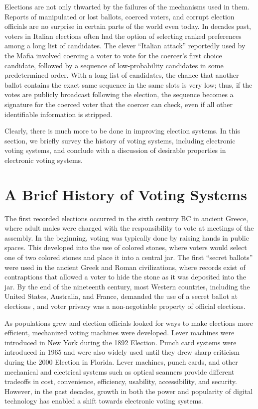 Elections are not only thwarted by the failures of the mechanisms used in them. Reports of manipulated or lost ballots, coerced voters, and corrupt election officials are no surprise in certain parts of the world even today. In decades past, voters in Italian elections often had the option of selecting ranked preferences among a long list of candidates. The clever ``Italian attack'' \cite{naish:italian-attack} reportedly used by the Mafia involved coercing a voter to vote for the coercer's first choice candidate, followed by a sequence of low-probability candidates in some predetermined order. With a long list of candidates, the chance that another ballot contains the exact same sequence in the same slots is very low; thus, if the votes are publicly broadcast following the election, the sequence becomes a signature for the coerced voter that the coercer can check, even if all other identifiable information is stripped.

Clearly, there is much more to be done in improving election systems. In this section, we briefly survey the history of voting systems, including electronic voting systems, and conclude with a discussion of desirable properties in electronic voting systems.

\section{A Brief History of Voting Systems} \label{intro:history}

The first recorded elections occurred in the sixth century BC in ancient Greece, where adult males were charged with the responsibility to vote at meetings of the assembly. In the beginning, voting was typically done by raising hands in public spaces. This developed into the use of colored stones, where voters would select one of two colored stones and place it into a central jar. The first ``secret ballots'' were used in the ancient Greek and Roman civilizations, where records exist of contraptions that allowed a voter to hide the stone as it was deposited into the jar. By the end of the nineteenth century, most Western countries, including the United States, Australia, and France, demanded the use of a secret ballot at elections \cite{wiki:secret-ballot}, and voter privacy was a non-negotiable property of official elections.

As populations grew and election officials looked for ways to make elections more efficient, mechanized voting machines were developed. Lever machines were introduced in New York during the 1892 Election. Punch card systems were introduced in 1965 and were also widely used until they drew sharp criticism during the 2000 Election in Florida. Lever machines, punch cards, and other mechanical and electrical systems such as optical scanners provide different tradeoffs in cost, convenience, efficiency, usability, accessibility, and security. However, in the past decades, growth in both the power and popularity of digital technology has enabled a shift towards electronic voting systems.

